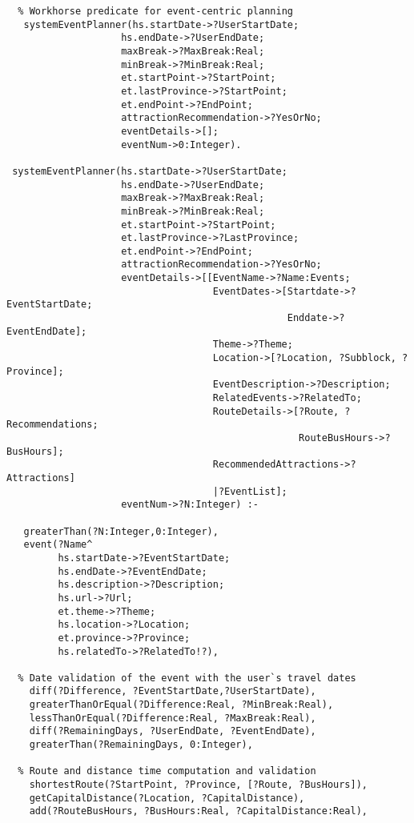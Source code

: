 \begin{verbatim}
  % Workhorse predicate for event-centric planning
   systemEventPlanner(hs.startDate->?UserStartDate;
                    hs.endDate->?UserEndDate;
                    maxBreak->?MaxBreak:Real; 
                    minBreak->?MinBreak:Real;
                    et.startPoint->?StartPoint;
                    et.lastProvince->?StartPoint;
                    et.endPoint->?EndPoint;
                    attractionRecommendation->?YesOrNo;
                    eventDetails->[];
                    eventNum->0:Integer).

 systemEventPlanner(hs.startDate->?UserStartDate; 
                    hs.endDate->?UserEndDate; 
                    maxBreak->?MaxBreak:Real;
                    minBreak->?MinBreak:Real; 
                    et.startPoint->?StartPoint;
                    et.lastProvince->?LastProvince;
                    et.endPoint->?EndPoint;
                    attractionRecommendation->?YesOrNo;
                    eventDetails->[[EventName->?Name:Events; 
                                    EventDates->[Startdate->?EventStartDate;
                                                 Enddate->?EventEndDate];
                                    Theme->?Theme; 
                                    Location->[?Location, ?Subblock, ?Province];
                                    EventDescription->?Description; 
                                    RelatedEvents->?RelatedTo; 
                                    RouteDetails->[?Route, ?Recommendations; 
                                                   RouteBusHours->?BusHours]; 
                                    RecommendedAttractions->?Attractions]
                                    |?EventList];
                    eventNum->?N:Integer) :-

   greaterThan(?N:Integer,0:Integer),
   event(?Name^ 
         hs.startDate->?EventStartDate; 
         hs.endDate->?EventEndDate;
         hs.description->?Description;
         hs.url->?Url;
         et.theme->?Theme; 
         hs.location->?Location; 
         et.province->?Province; 
         hs.relatedTo->?RelatedTo!?),
   
  % Date validation of the event with the user`s travel dates 
    diff(?Difference, ?EventStartDate,?UserStartDate),
    greaterThanOrEqual(?Difference:Real, ?MinBreak:Real),
    lessThanOrEqual(?Difference:Real, ?MaxBreak:Real),
    diff(?RemainingDays, ?UserEndDate, ?EventEndDate),
    greaterThan(?RemainingDays, 0:Integer),
 
  % Route and distance time computation and validation
    shortestRoute(?StartPoint, ?Province, [?Route, ?BusHours]),
    getCapitalDistance(?Location, ?CapitalDistance),
    add(?RouteBusHours, ?BusHours:Real, ?CapitalDistance:Real),
  

\end{verbatim}
